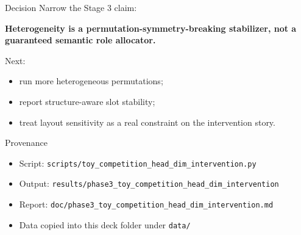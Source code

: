 \documentclass[aspectratio=169]{beamer}
\begin{document}
\begin{frame}{Decision}
  Narrow the Stage 3 claim:

  \vspace{0.6em}
  \textbf{Heterogeneity is a permutation-symmetry-breaking stabilizer, not a
  guaranteed semantic role allocator.}

  \vspace{0.8em}
  Next:
  \begin{itemize}
    \item run more heterogeneous permutations;
    \item report structure-aware slot stability;
    \item treat layout sensitivity as a real constraint on the intervention story.
  \end{itemize}
\end{frame}

\begin{frame}{Provenance}
  \begin{itemize}
    \item Script: \texttt{scripts/toy\_competition\_head\_dim\_intervention.py}
    \item Output: \texttt{results/phase3\_toy\_competition\_head\_dim\_intervention}
    \item Report: \texttt{doc/phase3\_toy\_competition\_head\_dim\_intervention.md}
    \item Data copied into this deck folder under \texttt{data/}
  \end{itemize}
\end{frame}
\end{document}

